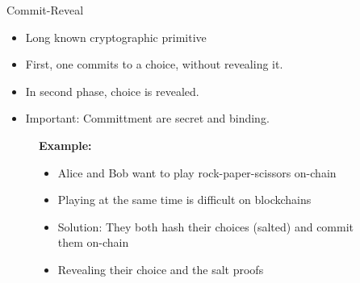 \documentclass[handout]{beamer}
\begin{document}

\begin{frame}{Commit-Reveal}
	\begin{itemize}
		\item<1 -> Long known cryptographic primitive
		\item<2 -> First, one commits to a choice, without revealing it.
		\item<3 -> In second phase, choice is revealed.
		\item<4 -> Important: Committment are secret and binding.
	\end{itemize}
	\vspace{0.5cm}
	\begin{figure}
		\begin{minipage}[h]{0.2\linewidth}
			\centering
		\end{minipage}%
		\hfill
		\begin{minipage}[h]{0.8\linewidth}
			\textbf{Example:}
			\begin{itemize}
				\item<5 -> Alice and Bob want to play rock-paper-scissors on-chain
				\item<6 -> Playing at the same time is difficult on blockchains
				\item<7 -> Solution: They both hash their choices (salted) and commit them on-chain
				\item<8 -> Revealing their choice and the salt proofs 
			\end{itemize}
		\end{minipage}
		\end{figure}
\end{frame}
\end{document}
